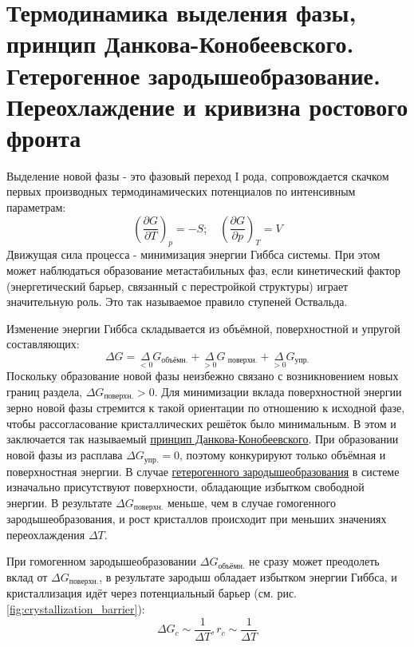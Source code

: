 \section{Термодинамика выделения фазы, принцип Данкова-Конобеевского.
Гетерогенное зародышеобразование. Переохлаждение и кривизна ростового фронта}
Выделение новой фазы - это фазовый переход I рода, сопровождается скачком первых производных термодинамических потенциалов по интенсивным параметрам:
\begin{equation}
\left(\frac{\partial G}{\partial T}\right)_p = -S; \quad \left(\frac{\partial G}{\partial p}\right)_T = V 
\label{eq:first_derivatives_G_S}  
\end{equation}
Движущая сила процесса - минимизация энергии Гиббса системы. При этом может наблюдаться образование метастабильных фаз, если кинетический фактор (энергетический барьер, связанный с перестройкой структуры) играет значительную роль. Это так называемое правило ступеней Оствальда. 
\par
Изменение энергии Гиббса складывается  из объёмной, поверхностной и упругой составляющих:
\begin{equation}
\Delta G = \underset{<0}\Delta G_{\text{объёмн.}} + \underset{>0}\Delta G_{\text{ поверхн.}} + \underset{>0}\Delta G _{\text{упр.}}
\label{eq:DeltaG_phase_transitions}  
\end{equation}
Поскольку образование новой фазы неизбежно связано с возникновением новых границ раздела, $\Delta G_{\text{поверхн.}}>0$. Для минимизации вклада поверхностной энергии зерно новой фазы стремится к такой ориентации по отношению к исходной фазе, чтобы  рассогласование кристаллических решёток было минимальным. В этом и заключается так называемый \underline{принцип Данкова-Конобеевского}. При образовании новой фазы из расплава $\Delta G_{\text{упр.}}=0$, поэтому конкурируют только объёмная и поверхностная энергии. В случае \underline{гетерогенного зародышеобразования} в системе изначально присутствуют поверхности, обладающие избытком свободной энергии. В результате $\Delta G_{\text{поверхн.}}$ меньше, чем в случае гомогенного зародышеобразования, и рост кристаллов происходит при меньших значениях переохлаждения $\Delta T$.
\par
При гомогенном зародышеобразовании $\Delta G_{\text{объёмн.}}$ не сразу может преодолеть вклад от $\Delta G_{\text{поверхн.}}$, в результате зародыш обладает избытком энергии Гиббса, и кристаллизация идёт через потенциальный барьер (см. рис. \ref{fig:crystallization_barrier}):
\begin{equation}
\Delta G_c \sim \frac{1}{\Delta T}, r_c \sim \frac{1}{\Delta T}
\label{eq:crystallization_energy_barrier}  
\end{equation}
